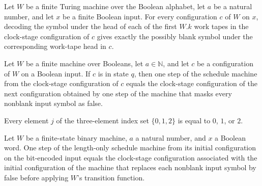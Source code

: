 \begin{lemma}
\label{Complexity.clockStageCfg_work}
\leanok
{}
Let $W$ be a finite Turing machine over the Boolean alphabet, let $a$ be a natural
number, and let $x$ be a finite Boolean input. For every configuration $c$ of $W$ on
$x$, decoding the symbol under the head of each of the first $W.k$ work tapes in the
clock-stage configuration of $c$ gives exactly the possibly blank symbol under the
corresponding work-tape head in $c$.
\end{lemma}

\begin{lemma}
\label{Complexity.clockStageCfg_step}
\leanok
{}
Let $W$ be a finite machine over Booleans, let $a\in\mathbb{N}$, and let $c$ be a
configuration of $W$ on a Boolean input. If $c$ is in state $q$, then one step of the
schedule machine from the clock-stage configuration of $c$ equals the clock-stage
configuration of the next configuration obtained by one step of the machine that masks
every nonblank input symbol as false.
\end{lemma}

\begin{lemma}
\label{Complexity.finThree_cases}
\leanok
{}
Every element $j$ of the three-element index set $\{0,1,2\}$ is equal to $0$, $1$, or
$2$.
\end{lemma}

\begin{lemma}
\label{Complexity.clockStageCfg_init}
\leanok
{}
Let $W$ be a finite-state binary machine, $a$ a natural number, and $x$ a Boolean word.
One step of the length-only schedule machine from its initial configuration on the
bit-encoded input equals the clock-stage configuration associated with the initial
configuration of the machine that replaces each nonblank input symbol by false before
applying $W$'s transition function.
\end{lemma}

